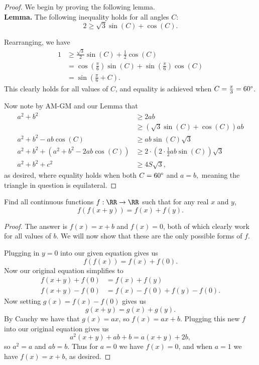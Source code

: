 \documentclass[letterpaper,oneside]{scrartcl}
\begin{document}
\begin{proof}
  We begin by proving the following lemma.\\
  \textbf{Lemma.} The following inequality holds for all angles \(C\):
  \[2 \geq \sqrt3\sin(C)+\cos(C).\]
  \begin{subproof}
    Rearranging, we have 
    \begin{align*}
      1 &\geq \frac{\sqrt3}{2}\sin(C) + \frac12\cos(C)\\
      &= \cos\left(\frac{\pi}{6}\right)\sin(C)+\sin\left(\frac{\pi}{6}\right)\cos(C) \\
      &= \sin\left(\frac{\pi}{6}+C\right).
    \end{align*}
    This clearly holds for all values of \(C\), and equality is achieved when \(C = \tfrac{\pi}{3} = 60\degree\).
  \end{subproof}

  Now note by AM-GM and our Lemma that 
  \begin{align*}
    a^2 + b^2 &\geq 2ab \\
    &\geq \left(\sqrt3\sin(C)+\cos(C)\right)ab \\
    a^2+b^2-ab\cos(C) &\geq ab\sin(C)\sqrt3 \\
    a^2+b^2 +(a^2+b^2-2ab\cos(C)) &\geq 2\cdot\left(2\cdot\tfrac12ab\sin(C)\right)\sqrt3 \\
    a^2+b^2 +c^2 &\geq 4S\sqrt3,
  \end{align*}
  as desired, where equality holds when both \(C = 60\degree\) and \(a=b,\) meaning the triangle in question is equilateral.
\end{proof}
\newpage
\begin{problem*}
  Find all continuous functions \(f : \RR \rightarrow \RR\) such that for any real \(x\) and \(y\),
  \[f(f(x+y)) = f(x)+f(y).\]
\end{problem*}
\begin{proof}
  The answer is \(f(x) = x + b\) and \(f(x)=0\), both of which clearly work for all values of \(b\). We will now show that these are the only possible forms of \(f\). 

  Plugging in \(y=0\) into our given equation gives us 
  \[f(f(x)) = f(x) + f(0).\]
  Now our original equation simplifies to 
  \begin{align*}
    f(x+y)+f(0) &= f(x) + f(y) \\
    f(x+y)-f(0) &= f(x) - f(0) + f(y) - f(0).
  \end{align*}
  Now setting \(g(x) = f(x)-f(0)\) gives us 
  \[g(x+y) = g(x) + g(y).\]
  By Cauchy we have that \(g(x) = ax\), so \(f(x) = ax+b.\) Plugging this new \(f\) into our original equation gives us
  \[a^2(x+y) + ab + b = a(x+y)+2b,\]
  so \(a^2=a\) and \(ab=b\). Thus for \(a=0\) we have \(f(x)=0\), and when \(a=1\) we have \(f(x) = x+b\), as desired.
\end{proof}
\end{document}
